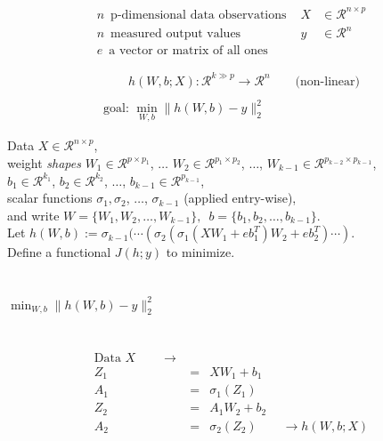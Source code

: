 \documentclass[12pt]{article}
\begin{document}
\begin{eqnarray*}
n\,\,\, \mbox{p-dimensional data observations } &X& \in \mathcal{R}^{n \times p} \\
n\,\,\,\mbox{measured output values } &y& \in \mathcal{R}^{n} \\
e\,\,\, \mbox{a vector or matrix of all ones}
\end{eqnarray*}

\begin{eqnarray*}
\qquad h(W,b; X):\mathcal{R}^{k \gg p}\rightarrow\mathcal{R}^n\qquad\mbox{(non-linear)}\\
\\
\mbox{goal: }  \min_{W, b}\|h(W, b) - y\|_2^2\qquad\mbox{ }
\end{eqnarray*}

\noindent
Data  $X\in\mathcal{R}^{n\times p}$,\\
weight \emph{shapes} $W_1 \in \mathcal{R}^{p \times p_1}$, $\ldots$
$W_2\in\mathcal{R}^{p_1 \times p_2}$, $\ldots$,
$W_{k-1}\in\mathcal{R}^{p_{k-2} \times p_{k-1}}$,\\
$b_1\in\mathcal{R}^{k_1}$, $b_2\in\mathcal{R}^{k_2}$,
$\ldots$, $b_{k-1}\in\mathcal{R}^{p_{k-1}}$,\\
scalar functions $\sigma_1, \sigma_2$, $\ldots$, $\sigma_{k-1}$ (applied entry-wise),\\
and write   $W=\{W_1, W_2, \ldots,W_{k-1}\}, \,\,\, b=\{b_1, b_2, \ldots, b_{k-1}\}$.\\

\noindent
Let $h(W,b) := \sigma_{k-1}(\cdots(\sigma_2( \sigma_1(X W_1 + eb_1^T)W_2 + eb_2^T)\cdots)$.\\

\noindent
Define a functional $J(h; y)$ to minimize.
\\
\\
\\

$\min_{W,b}\|h(W,b)-y\|_2^2$
\\
\\
\\

\begin{eqnarray*}
\mbox{Data } X \qquad\rightarrow\\
Z_1 &=& XW_1 + b_1\\
A_1 &=& \sigma_1(Z_1) \\
Z_2 &=& A_1 W_2 + b_2\\
A_2 &=& \sigma_2(Z_2) \qquad \rightarrow h(W, b; X)
\end{eqnarray*}
\end{document}
